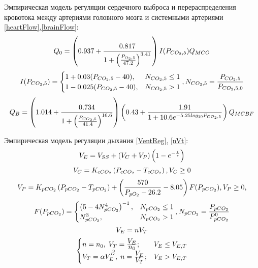 Эмпирическая модель регуляции сердечного выброса и перераспределения кровотока между  артериями головного мозга и системными артериями \eqref{heartFlow},\eqref{brainFlow}:
\begin{equation}
Q_{0}=\left(0.937+\frac{0.817}{1+\left(\frac{P_{O_{2},5}}{47.2} \right)^{3.41}} \right)I(P_{CO_{2},5})Q_{MCO}\notag
\end{equation}
\begin{equation}
I(P_{CO_{2},5})=\begin{cases}
1+0.03(P_{CO_{2},5}-40), & N_{CO_{2},5}\le 1 \\
1-0.025(P_{CO_{2},5}-40), & N_{CO_{2},5}> 1 
\end{cases}, 
N_{CO_{2},5}=\frac{P_{CO_{2},5}}{P_{CO_{2},5,0}}\notag
\end{equation}
\begin{equation}
Q_{B}=\left(1.014+\frac{0.734}{1+\left(\frac{P_{CO_{2},5}}{41.4}\right)^{16.6}} \right)\left(0.43+\frac{1.91}{1+10.6e^{-5.25log_{10}P_{CO_{2},5}}} \right)Q_{MCBF} \notag
\end{equation}

Эмпирическая модель регуляции дыхания \eqref{VentReg}, \eqref{nVt}:
\begin{equation}
V_{E}=V_{SS}+\left(V_{C}+V_{P}\right)\left(1-e^{-\frac{t}{\tau}}\right) \notag
\end{equation}
\begin{equation}
V_{C}=K_{cCO_{2}}\left(P_{cCO_{2}}-T_{cCO_{2}} \right), V_{C}\ge 0 \notag
\end{equation}
\begin{equation}
V_{P}=K_{pCO_{2}}\left(P_{pCO_{2}}-T_{pCO_{2}} \right)+\left(\frac{570}{P_{pO_{2}}-26.2}-8.05\right)F(P_{pCO_{2}}), V_{P}\ge 0, \notag
\end{equation}
\begin{equation}
F(P_{pCO_{2}})=\begin{cases}
\left(5-4N_{pCO_{2}}^4 \right)^{-1}, & N_{pCO_{2}}\le 1 \\
N_{pCO_{2}}^3, & N_{pCO_{2}}> 1 
\end{cases}, 
N_{pCO_{2}}=\frac{P_{pCO_{2}}}{P_{pCO_{2}}^0} \notag
\end{equation}
\begin{equation}
V_{E}=nV_{T} \notag
\end{equation}
\begin{equation} 
\begin{cases}
n=n_{0},\; V_{T}=\frac{\displaystyle V_{E}}{\displaystyle n_{0}}; & V_{E} \le V_{E,T}  \\
V_{T}=\alpha V_{E}^{\displaystyle \beta},\; n= \frac{\displaystyle V_{E}}{\displaystyle V_{T}}; & V_{E} > V_{E,T}
\end{cases}\notag
\end{equation}

